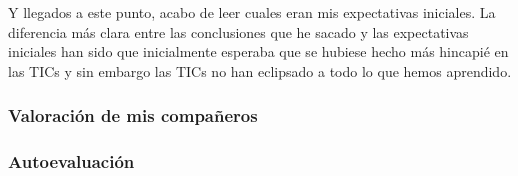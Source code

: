 \begin{leftbar}{\guscolor}
Y llegados a este punto, acabo de leer cuales eran mis expectativas iniciales. La diferencia más clara entre las conclusiones que he sacado y las expectativas iniciales han sido que inicialmente esperaba que se hubiese hecho más hincapié en las TICs y sin embargo las TICs no han eclipsado a todo lo que hemos aprendido.

\subsubsection{Valoración de mis compañeros}

\subsubsection{Autoevaluación}


\end{leftbar}

